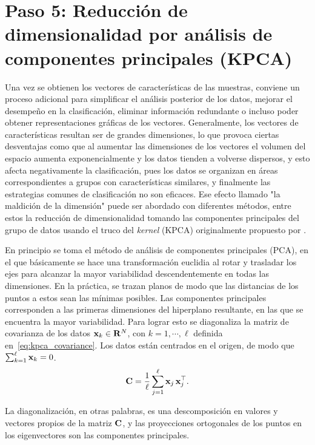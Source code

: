 \section*{Paso 5: Reducción de dimensionalidad por análisis de componentes principales (KPCA)}
\label{sec:kpca_reduction}
Una vez se obtienen los vectores de características de las muestras, conviene un proceso adicional para simplificar el análisis posterior de los datos, mejorar el desempeño en la clasificación, eliminar información redundante o incluso poder obtener representaciones gráficas de los vectores.
Generalmente, los vectores de características resultan ser de grandes dimensiones, lo que provoca ciertas desventajas como que al aumentar las dimensiones de los vectores el volumen del espacio aumenta exponencialmente y los datos tienden a volverse dispersos, y esto afecta negativamente la clasificación, pues los datos se organizan en áreas correspondientes a grupos con características similares, y finalmente las estrategias comunes de clasificación no son eficaces.
Ese efecto llamado "la maldición de la dimensión" puede ser abordado con diferentes métodos, entre estos la reducción de dimensionalidad tomando las componentes principales del grupo de datos usando el truco del \emph{kernel} (KPCA) originalmente propuesto por \citet{Scholkopf1997}.

En principio se toma el método de análisis de componentes principales (PCA), en el que básicamente se hace una transformación euclidia al rotar y trasladar los ejes para alcanzar la mayor variabilidad descendentemente en todas las dimensiones.
En la práctica, se trazan planos de modo que las distancias de los puntos a estos sean las mínimas posibles.
Las componentes principales corresponden a las primeras dimensiones del hiperplano resultante, en las que se encuentra la mayor variabilidad.
Para lograr esto se diagonaliza la matriz de covarianza de los datos $\mathrm{\mathbf{x}}_k \in \mathrm{\mathbf{R}}^N$, con $k = 1, \cdots, \ell$ definida en~\eqref{eq:kpca_covariance}.
Los datos están centrados en el origen, de modo que $\sum_{k = 1}^\ell \mathrm{\mathbf{x}}_k = 0$.
%
\begin{equation}
    \label{eq:kpca_covariance}
    \vect{C} = \frac{1}{\ell} \sum_{j = 1}^\ell \vect{x}_j\,\vect{x}_j^\top.
\end{equation}

La diagonalización, en otras palabras, es una descomposición en valores y vectores propios de la matriz $\mathrm{\mathbf{C}}$, y las proyecciones ortogonales de los puntos en los eigenvectores son las componentes principales.


